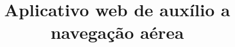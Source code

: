 \documentclass[msc,brazilian]{thesispuc}%
\title{Aplicativo web de auxílio a navegação aérea}
\begin{document}
  
  
  
  
  \arial
   
\end{document}
